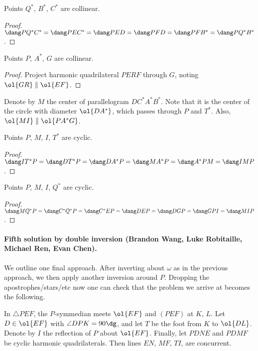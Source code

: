 \documentclass[11pt]{scrartcl}
\begin{document}
\begin{claim*}
  Points $Q^\ast$, $B^\ast$, $C^\ast$ are collinear.
\end{claim*}
\begin{proof}
  $\dang PQ^\ast C^\ast = \dang PEC^\ast = \dang PED = \dang PFD
  = \dang PFB^\ast = \dang PQ^\ast B^\ast$.
\end{proof}

\begin{claim*}
  [cf Brazil 2011/5]
  Points $P$, $A^\ast$, $G$ are collinear.
\end{claim*}
\begin{proof}
  Project harmonic quadrilateral $PERF$ through $G$,
  noting $\ol{GR} \parallel \ol{EF}$.
\end{proof}

Denote by $M$ the center of parallelogram $DC^\ast A^\ast B^\ast$.
Note that it is the center of the circle with
diameter $\ol{DA^\ast}$, which passes through $P$ and $T^\ast$.
Also, $\ol{MI} \parallel \ol{PA^\ast G}$.

\begin{claim*}
  Points $P$, $M$, $I$, $T^\ast$ are cyclic.
\end{claim*}
\begin{proof}
  $\dang IT^\ast P = \dang D T^\ast P = \dang DA^\ast P
    = \dang M A^\ast P = \dang A^\ast P M  = \dang IMP$.
\end{proof}

\begin{claim*}
  Points $P$, $M$, $I$, $Q^\ast$ are cyclic.
\end{claim*}
\begin{proof}
  $\dang MQ^\ast P = \dang C^\ast Q^\ast P = \dang C^\ast E P
  = \dang D E P = \dang D G P = \dang GPI = \dang MIP$.
\end{proof}

\paragraph{Fifth solution by double inversion (Brandon Wang, Luke Robitaille, Michael Ren, Evan Chen).}
We outline one final approach.
After inverting about $\omega$ as in the previous approach,
we then apply another inversion around $P$.
Dropping the apostrophes/stars/etc now one can check
that the problem we arrive at becomes the following.
\begin{proposition*}
  In $\triangle PEF$, the $P$-symmedian meets $\ol{EF}$
  and $(PEF)$ at $K$, $L$.
  Let $D \in \ol{EF}$ with $\angle DPK = 90\dg$,
  and let $T$ be the foot from $K$ to $\ol{DL}$.
  Denote by $I$ the reflection of $P$ about $\ol{EF}$.
  Finally, let $PDNE$ and $PDMF$ be cyclic harmonic quadrilaterals.
  Then lines $EN$, $MF$, $TI$, are concurrent.
\end{proposition*}
\end{document}
